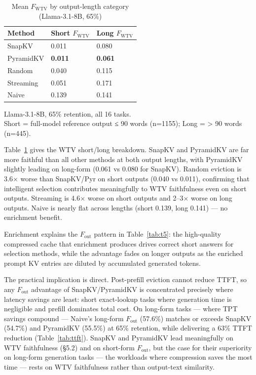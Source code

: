 \documentclass[10pt,letterpaper]{article}
\begin{document}
\begin{table}[H]
\centering
\small
\caption{Mean \(F_{\text{WTV}}\) by output-length category (Llama-3.1-8B, 65\%)}
\label{tab:t6}
\begin{tabular}{@{}lll@{}}
\toprule
Method & Short \(F_{\text{WTV}}\) & Long \(F_{\text{WTV}}\)\\
\midrule
SnapKV    & 0.011          & 0.080\\
PyramidKV & \textbf{0.011} & \textbf{0.061}\\
Random    & 0.040          & 0.115\\
Streaming & 0.051          & 0.171\\
Naive     & 0.139          & 0.141\\
\bottomrule
\end{tabular}
\center
Llama-3.1-8B, 65\% retention, all 16 tasks.
\\Short = full-model reference output ≤ 90 words (n=1155); Long =
\textgreater{} 90 words (n=445).
\end{table}

Table~\ref{tab:t6} gives the WTV short/long breakdown.
SnapKV and PyramidKV are far more faithful than all other methods at
both output lengths, with PyramidKV slightly leading on long-form (0.061 vs 0.080
for SnapKV). Random eviction is 3.6$\times$ worse than SnapKV/Pyr on short outputs
(0.040 vs 0.011), confirming that intelligent selection contributes meaningfully to
WTV faithfulness even on short outputs. Streaming is 4.6$\times$ worse on short outputs and
2--3$\times$ worse on long outputs. Naive is nearly flat across lengths
(short 0.139, long 0.141) --- no enrichment benefit.

Enrichment explains the \(F_{\text{out}}\) pattern in Table~\ref{tab:t5}:
the high-quality compressed cache that enrichment produces drives correct
short answers for selection methods, while the advantage fades on longer
outputs as the enriched prompt KV entries are diluted by accumulated
generated tokens.

The practical implication is direct. Post-prefill eviction cannot reduce
TTFT, so any \(F_{\text{out}}\) advantage of SnapKV/PyramidKV is
concentrated precisely where latency savings are least: short exact-lookup
tasks where generation time is negligible and prefill dominates total cost.
On long-form tasks --- where TPT savings compound --- Naive's long-form
\(F_{\text{out}}\) (57.6\%) matches or exceeds SnapKV (54.7\%) and
PyramidKV (55.5\%) at 65\% retention, while delivering a 63\% TTFT reduction
(Table~\ref{tab:ttft}). SnapKV and PyramidKV lead meaningfully on WTV faithfulness
(§5.2) and on short-form \(F_{\text{out}}\), but the case for their superiority
on long-form generation tasks --- the workloads where compression saves the most
time --- rests on WTV faithfulness rather than output-text similarity.
\end{document}
